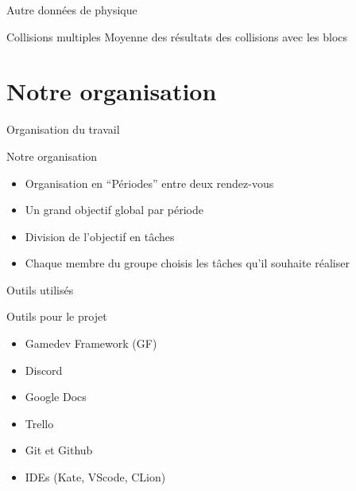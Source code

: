\documentclass{beamer}
\begin{document}
{\begin{frame}{Autre données de physique}
    \begin{block}{Collisions multiples}
        Moyenne des résultats des collisions avec les blocs
    \end{block}
\end{frame}

\section{Notre organisation}
\begin{frame}{Organisation du travail}
    \begin{block}{Notre organisation}
        \begin{itemize}
            \item[\bullet] Organisation en ``Périodes'' entre deux rendez-vous
            \item[\bullet] Un grand objectif global par période
            \item[\bullet] Division de l'objectif en tâches
            \item[\bullet] Chaque membre du groupe choisis les tâches qu'il souhaite réaliser
        \end{itemize}
    \end{block}
\end{frame}

\begin{frame}{Outils utilisés}
    \begin{block}{Outils pour le projet}
        \begin{itemize}
            \item[\bullet] Gamedev Framework (GF)
            \item[\bullet] Discord
            \item[\bullet] Google Docs
            \item[\bullet] Trello
            \item[\bullet] Git et Github
            \item[\bullet] IDEs (Kate, VScode, CLion)
        \end{itemize}
    \end{block}
\end{frame}

}
\end{document}
